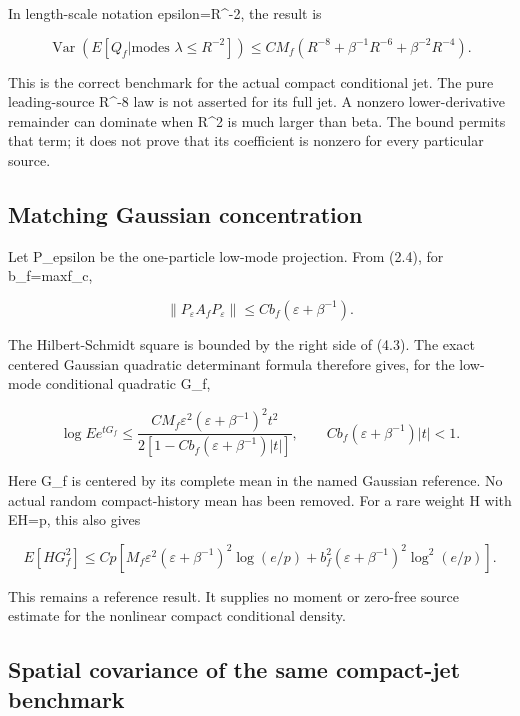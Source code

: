 \documentclass[
  11pt,
]{article}
\begin{document}
In length-scale notation epsilon=R\^{}-2, the result is

\[
 \operatorname{Var}(E[Q_f|\text{modes }\lambda\le R^{-2}])
 \le C M_f\left(R^{-8}+\beta^{-1}R^{-6}
                           +\beta^{-2}R^{-4}\right).
\tag{4.4}
\]

This is the correct benchmark for the actual compact conditional jet.
The pure leading-source R\^{}-8 law is not asserted for its full jet. A
nonzero lower-derivative remainder can dominate when R\^{}2 is much
larger than beta. The bound permits that term; it does not prove that
its coefficient is nonzero for every particular source.

\hypertarget{matching-gaussian-concentration}{%
\subsection{Matching Gaussian
concentration}\label{matching-gaussian-concentration}}

Let P\_epsilon be the one-particle low-mode projection. From (2.4), for
b\_f=max\textbar f\_c\textbar,

\[
 \|P_\varepsilon A_fP_\varepsilon\|
 \le Cb_f(\varepsilon+\beta^{-1}).
\tag{5.1}
\]

The Hilbert-Schmidt square is bounded by the right side of (4.3). The
exact centered Gaussian quadratic determinant formula therefore gives,
for the low-mode conditional quadratic G\_f,

\[
 \boxed{\quad
 \log E e^{tG_f}
 \le\frac{C M_f\varepsilon^2(\varepsilon+\beta^{-1})^2 t^2}
              {2[1-Cb_f(\varepsilon+\beta^{-1})|t|]},
 \qquad Cb_f(\varepsilon+\beta^{-1})|t|<1.
 \quad}
\tag{5.2}
\]

Here G\_f is centered by its complete mean in the named Gaussian
reference. No actual random compact-history mean has been removed. For a
rare weight H with EH=p, this also gives

\[
 E[HG_f^2]\le Cp\left[
 M_f\varepsilon^2(\varepsilon+\beta^{-1})^2\log(e/p)
 +b_f^2(\varepsilon+\beta^{-1})^2\log^2(e/p)
 \right].
\tag{5.3}
\]

This remains a reference result. It supplies no moment or zero-free
source estimate for the nonlinear compact conditional density.

\hypertarget{spatial-covariance-of-the-same-compact-jet-benchmark}{%
\subsection{Spatial covariance of the same compact-jet
benchmark}\label{spatial-covariance-of-the-same-compact-jet-benchmark}}
\end{document}

